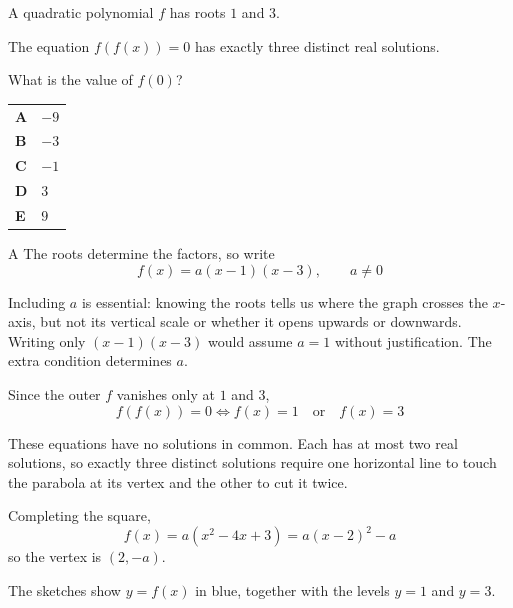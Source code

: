 \documentclass[11pt,a4paper]{article}
\begin{document}
\clearpage
\thispagestyle{djssolutions}
\vspace*{8pt}
\begin{enumerate}[label=\textbf{\arabic*.},leftmargin=*,itemsep=0pt,start=16]
\questionitem[Polynomials]
A quadratic polynomial $f$ has roots $1$ and $3$.

The equation $f(f(x))=0$ has exactly three distinct real solutions. 

What is the value of $f(0)$?

\par\vspace*{12pt}
\begin{tabularx}{\linewidth}{@{}>{\bfseries}l Y@{}}
A &
$-9$
\\[0.8em]
B &
$-3$
\\[0.8em]
C &
$-1$
\\[0.8em]
D &
$3$
\\[0.8em]
E &
$9$
\\
\end{tabularx}

\begin{djsSolution}{A}
The roots determine the factors, so write
\[
f(x)=a(x-1)(x-3),\qquad a\ne0
\]

Including $a$ is essential: knowing the roots tells us where the graph crosses the $x$-axis, but not its vertical scale or whether it opens upwards or downwards. Writing only $(x-1)(x-3)$ would assume $a=1$ without justification. The extra condition determines $a$.

Since the outer $f$ vanishes only at $1$ and $3$,
\[
f(f(x))=0
\iff f(x)=1\quad\text{or}\quad f(x)=3
\]

These equations have no solutions in common. Each has at most two real solutions, so exactly three distinct solutions require one horizontal line to touch the parabola at its vertex and the other to cut it twice.

Completing the square,
\[
f(x)=a(x^2-4x+3)=a(x-2)^2-a
\]
so the vertex is $(2,-a)$.

The sketches show $y=f(x)$ in blue, together with the levels $y=1$ and $y=3$.


\end{djsSolution}
\end{enumerate}
\end{document}
